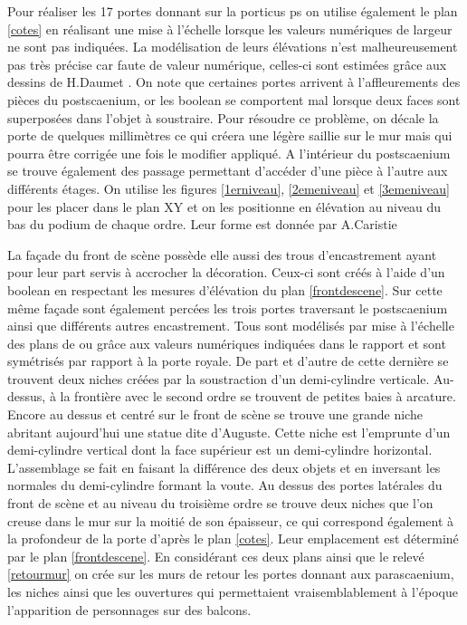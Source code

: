 Pour réaliser les 17 portes donnant sur la \gls{porticus ps} on utilise également le plan \ref{cotes} en réalisant une mise à l'échelle lorsque les valeurs numériques de largeur ne sont pas indiquées. La modélisation de leurs élévations n'est malheureusement pas très précise car faute de valeur numérique, celles-ci sont estimées grâce aux dessins de H.Daumet \cite[Pl. XII, XIII, XIV]{orangePl}. On note que certaines portes arrivent à l'affleurements des pièces du \gls{postscaenium}, or les \gls{boolean} se comportent mal lorsque deux faces sont superposées dans l'objet à soustraire. Pour résoudre ce problème, on décale la porte de quelques millimètres ce qui créera une légère saillie sur le mur mais qui pourra être corrigée une fois le modifier appliqué. A l'intérieur du \gls{postscaenium} se trouve également des passage permettant d'accéder d'une pièce à l'autre aux différents étages. On utilise les figures \ref{1erniveau}, \ref{2emeniveau} et \ref{3emeniveau} pour les placer dans le plan XY et on les positionne en élévation au niveau du bas du podium de chaque ordre. Leur forme est donnée par A.Caristie \cite[Pl. II]{orangePl}

La façade du front de scène possède elle aussi des trous d'encastrement ayant pour leur part servis à accrocher la décoration. Ceux-ci sont créés à l'aide d'un \gls{boolean} en respectant les mesures d'élévation du plan \ref{frontdescene}. Sur cette même façade sont également percées les trois portes traversant le \gls{postscaenium} ainsi que différents autres encastrement. Tous sont modélisés par mise à l'échelle des plans de \cite{orangePl} ou grâce aux valeurs numériques indiquées dans le rapport \cite{orangeTxt} et sont symétrisés par rapport à la porte royale. De part et d'autre de cette dernière se trouvent deux niches créées par la soustraction d'un demi-cylindre verticale. Au-dessus, à la frontière avec le second ordre se trouvent de petites baies à arcature. Encore au dessus et centré sur le front de scène se trouve une grande niche abritant aujourd'hui une statue dite d'Auguste. Cette niche est l'emprunte d'un demi-cylindre vertical dont la face supérieur est un demi-cylindre horizontal. L'assemblage se fait en faisant la différence des deux objets et en inversant les normales du demi-cylindre formant la voute. Au dessus des portes latérales du front de scène et au niveau du troisième ordre se trouve deux niches que l'on creuse dans le mur sur la moitié de son épaisseur, ce qui correspond également à la profondeur de la porte d'après le plan \ref{cotes}. Leur emplacement est déterminé par le plan \ref{frontdescene}. En considérant ces deux plans ainsi que le relevé \ref{retourmur} on crée sur les murs de retour les portes donnant aux \gls{parascaenium}, les niches ainsi que les ouvertures qui permettaient vraisemblablement à l'époque l'apparition de personnages sur des balcons. 


